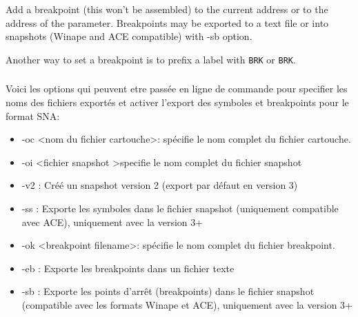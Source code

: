 \begin{xen}
Add a breakpoint (this won't be assembled) to the current address or to the address of the parameter. Breakpoints may be exported to a text file or into snapshots (Winape and ACE compatible) with -sb option.

Another way to set a breakpoint is to prefix a label with \texttt{BRK} or \texttt{\at BRK}.
\end{xen}

\subsubsection{}    \label{options_export_cpc}
\begin{xfr}
Voici les options qui peuvent etre passée en ligne de commande pour specifier les noms des fichiers exportés et activer l'export des symboles et breakpoints pour le format SNA:
\end{xfr}


\begin{xfr}
\begin{itemize}
\item -oc \textless nom du fichier cartouche\textgreater : spécifie le nom complet du fichier cartouche.
\item -oi \textless fichier snapshot \textgreater specifie le nom complet du fichier snapshot
\item -v2 : Créé un snapshot version 2 (export par défaut en version 3)
\item -ss :	Exporte les symboles dans le fichier snapshot (uniquement compatible avec ACE), uniquement avec la version 3+
\item -ok \textless breakpoint filename\textgreater : spécifie le nom complet du fichier breakpoint.
\item -eb : Exporte les breakpoints dans un fichier texte
\item -sb : Exporte les points d'arrêt (breakpoints) dans le fichier snapshot (compatible avec les formats Winape et ACE), uniquement avec la version 3+
\end{itemize}
\end{xfr}

